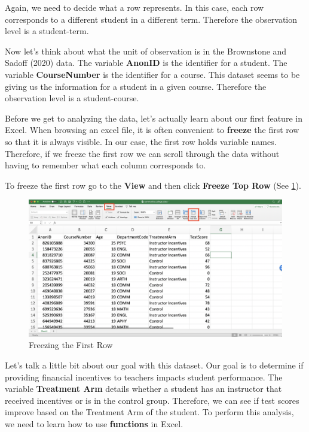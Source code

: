 \documentclass[
]{book}
\begin{document}
Again, we need to decide what a row represents. In this case, each row corresponds to a different student in a different term. Therefore the observation level is a student-term.

Now let's think about what the unit of observation is in the Brownstone and Sadoff (2020) data. The variable \textbf{AnonID} is the identifier for a student. The variable \textbf{CourseNumber} is the identifier for a course. This dataset seems to be giving us the information for a student in a given course. Therefore the observation level is a student-course.

Before we get to analyzing the data, let's actually learn about our first feature in Excel. When browsing an excel file, it is often convenient to \textbf{freeze} the first row so that it is always visible. In our case, the first row holds variable names. Therefore, if we freeze the first row we can scroll through the data without having to remember what each column corresponds to.

To freeze the first row go to the \textbf{View} and then click \textbf{Freeze Top Row} (See \ref{fig:freeze}).

\begin{figure}

{\centering \includegraphics[width=1\linewidth]{images/01_freeze} 

}

\caption{Freezing the First Row}\label{fig:freeze}
\end{figure}

Let's talk a little bit about our goal with this dataset. Our goal is to determine if providing financial incentives to teachers impacts student performance. The variable \textbf{Treatment Arm} details whether a student has an instructor that received incentives or is in the control group. Therefore, we can see if test scores improve based on the Treatment Arm of the student. To perform this analysis, we need to learn how to use \textbf{functions} in Excel.
\end{document}
